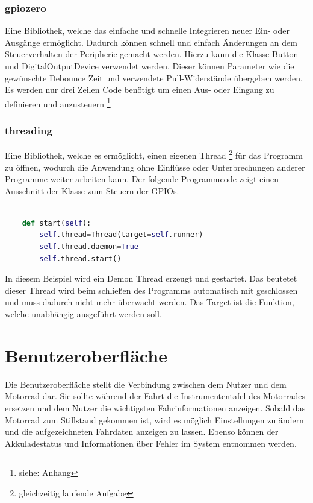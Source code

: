 \subsubsection{gpiozero}

Eine Bibliothek, welche das einfache und schnelle Integrieren neuer Ein- oder Ausgänge ermöglicht. Dadurch können schnell und einfach Änderungen an dem Steuerverhalten der Peripherie gemacht werden. Hierzu kann die Klasse Button und DigitalOutputDevice verwendet werden. Dieser können Parameter wie die gewünschte Debounce Zeit und verwendete Pull-Widerstände übergeben werden. Es werden nur drei Zeilen Code benötigt um einen Aus- oder Eingang zu definieren und anzusteuern \footnote{siehe: Anhang}

\subsubsection{threading}

Eine Bibliothek, welche es ermöglicht, einen eigenen Thread \footnote{gleichzeitig laufende Aufgabe} für das Programm zu öffnen, wodurch die Anwendung ohne Einflüsse oder Unterbrechungen anderer Programme weiter arbeiten kann. Der folgende Programmcode zeigt einen Ausschnitt der Klasse zum Steuern der GPIOs. 

\begin{lstlisting}[language=Python, caption={Code zum Starten eines Threads},captionpos=b]
	
	def start(self):
		self.thread=Thread(target=self.runner)
		self.thread.daemon=True
		self.thread.start()

\end{lstlisting}

In diesem Beispiel wird ein Demon Thread erzeugt und gestartet. Das beutetet dieser Thread wird beim schließen des Programms automatisch mit geschlossen und muss dadurch nicht mehr überwacht werden. Das Target ist die Funktion, welche unabhängig ausgeführt werden soll.

\newpage


\section{Benutzeroberfläche}
Die Benutzeroberfläche stellt die Verbindung zwischen dem Nutzer und dem Motorrad dar. Sie sollte während der Fahrt die Instrumententafel des Motorrades ersetzen und dem Nutzer die wichtigsten Fahrinformationen anzeigen. Sobald das Motorrad zum Stillstand gekommen ist, wird es möglich Einstellungen zu ändern und die aufgezeichneten Fahrdaten anzeigen zu lassen. Ebenso können der Akkuladestatus und Informationen über Fehler im System entnommen werden.

